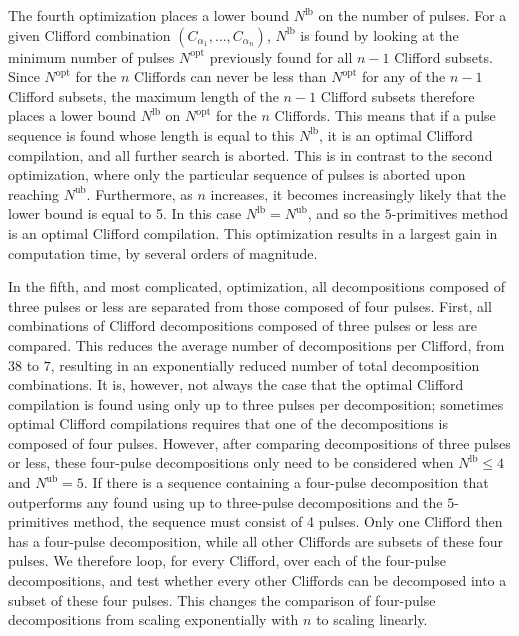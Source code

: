     The fourth optimization places a lower bound $N^\text{lb}$ on the number of pulses. For a given Clifford combination $\left(C_{\alpha_1}, \dots, C_{\alpha_n}\right)$, $N^\text{lb}$ is found by looking at the minimum number of pulses $N^\text{opt}$ previously found for all $n-1$ Clifford subsets. Since $N^\text{opt}$ for the $n$ Cliffords can never be less than $N^\text{opt}$ for any of the $n-1$ Clifford subsets, the maximum length of the $n-1$ Clifford subsets therefore places a lower bound $N^\text{lb}$ on $N^\text{opt}$ for the $n$ Cliffords. This means that if a pulse sequence is found whose length is equal to this $N^\text{lb}$, it is an optimal Clifford compilation, and all further search is aborted. This is in contrast to the second optimization, where only the particular sequence of pulses is aborted upon reaching $N^\text{ub}$. Furthermore, as $n$ increases, it becomes increasingly likely that the lower bound is equal to 5. In this case $N^\text{lb}=N^\text{ub}$, and so the $5$-primitives method is an optimal Clifford compilation. This optimization results in a largest gain in computation time, by several orders of magnitude.

    In the fifth, and most complicated, optimization, all decompositions composed of three pulses or less are separated from those composed of four pulses. First, all combinations of Clifford decompositions composed of three pulses or less are compared. This reduces the average number of decompositions per Clifford, from $38$ to $7$, resulting in an exponentially reduced number of total decomposition combinations. It is, however, not always the case that the optimal Clifford compilation is found using only up to three pulses per decomposition; sometimes optimal Clifford compilations requires that one of the decompositions is composed of four pulses. However, after comparing decompositions of three pulses or less, these four-pulse decompositions only need to be considered when $N^\text{lb} \leq 4$ and $N^\text{ub} =5$. If there is a sequence containing a four-pulse decomposition that outperforms any found using up to three-pulse decompositions and the $5$-primitives method, the sequence must consist of 4 pulses. Only one Clifford then has a four-pulse decomposition, while all other Cliffords are subsets of these four pulses. We therefore loop, for every Clifford, over each of the four-pulse decompositions, and test whether every other Cliffords can be decomposed into a subset of these four pulses. This changes the comparison of four-pulse decompositions from scaling exponentially with $n$ to scaling linearly.

